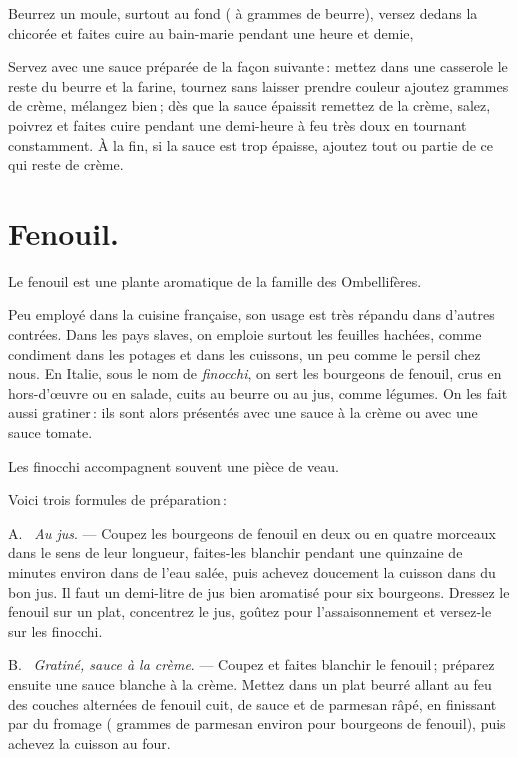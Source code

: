 Beurrez un moule, surtout au fond ({\mmm} à {\mmm} grammes de
beurre), versez dedans la chicorée et faites cuire au bain-marie pendant une
heure et demie,

Servez avec une sauce préparée de la façon suivante : mettez dans une casserole
le reste du beurre et la farine, tournez sans laisser prendre couleur ajoutez
{\mmm} grammes de crème, mélangez bien ; dès que la sauce épaissit
remettez de la crème, salez, poivrez et faites cuire pendant une demi-heure
à feu très doux en tournant constamment. À la fin, si la sauce est trop
épaisse, ajoutez tout ou partie de ce qui reste de crème.

\section*{\centering Fenouil.}
{}

Le fenouil est une plante aromatique de la famille des Ombellifères.

Peu employé dans la cuisine française, son usage est très répandu dans d'autres
contrées. Dans les pays slaves, on emploie surtout les feuilles hachées, comme
condiment dans les potages et dans les cuissons, un peu comme le persil chez
nous. En Italie, sous le nom de \textit{finocchi}, on sert les bourgeons de
fenouil, crus en hors-d'œuvre ou en salade, cuits au beurre ou au jus, comme
légumes. On les fait aussi gratiner : ils sont alors présentés avec une sauce
à la crème ou avec une sauce tomate.

Les finocchi accompagnent souvent une pièce de veau.

\medskip

Voici trois formules de préparation :

\medskip

A. \textit{ Au jus}. — Coupez les bourgeons de fenouil en deux ou en quatre
morceaux dans le sens de leur longueur, faites-les blanchir pendant une
quinzaine de minutes environ dans de l'eau salée, puis achevez doucement la
cuisson dans du bon jus. Il faut un demi-litre de jus bien aromatisé pour six
bourgeons. Dressez le fenouil sur un plat, concentrez le jus, goûtez pour
l’assaisonnement et versez-le sur les finocchi.

\medskip

B. \textit{ Gratiné, sauce à la crème}. — Coupez et faites blanchir le fenouil ;
préparez ensuite une sauce blanche à la crème. Mettez dans un plat beurré
allant au feu des couches alternées de fenouil cuit, de sauce et de parmesan
râpé, en finissant par du fromage ({\mmm} grammes de parmesan environ pour
{\mmm} bourgeons de fenouil), puis achevez la cuisson au four.

